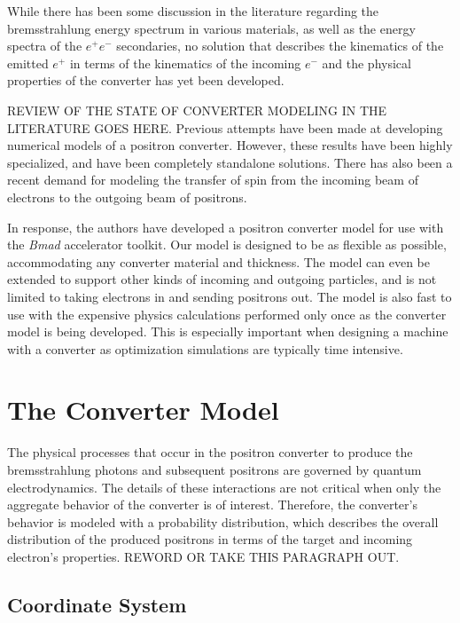 \documentclass[letter,
               biblatex,     %
               keeplastbox,   %
               ]{jacow}
\newcommand{\bmad}{\textit{Bmad}\xspace}
\begin{document}
While there has been some discussion in the literature regarding the bremsstrahlung energy spectrum in various materials, %
as well as the energy spectra of the $e^+ e^-$ secondaries, %
no solution that describes the kinematics of the emitted $e^+$ in terms of the kinematics of the incoming $e^-$ and the physical properties of the converter has yet been developed.

REVIEW OF THE STATE OF CONVERTER MODELING IN THE LITERATURE GOES HERE.
Previous attempts have been made at developing numerical models of a positron converter. %
However, these results have been highly specialized, and have been completely standalone solutions. 
There has also been a recent demand for modeling the transfer of spin from the incoming beam of electrons to the outgoing beam of positrons. %

In response, the authors have developed a positron converter model for use with the \bmad\cite{b:bmad} accelerator toolkit.
Our model is designed to be as flexible as possible, accommodating any converter material and thickness.
The model can even be extended to support other kinds of incoming and outgoing particles, and is not limited to taking electrons in and sending positrons out.
The model is also fast to use with the expensive physics calculations performed only once as the converter model is being developed. This is especially important when designing a machine with a converter as optimization simulations are typically time intensive.

\section{The Converter Model}

The physical processes that occur in the positron converter to produce the bremsstrahlung photons and subsequent positrons are governed by quantum electrodynamics. %
The details of these interactions are not critical when only the aggregate behavior of the converter is of interest.
Therefore, the converter's behavior is modeled with a probability distribution, which describes the overall distribution of the produced positrons in terms of the target and incoming electron's properties. REWORD OR TAKE THIS PARAGRAPH OUT.

\subsection{Coordinate System}
\end{document}
